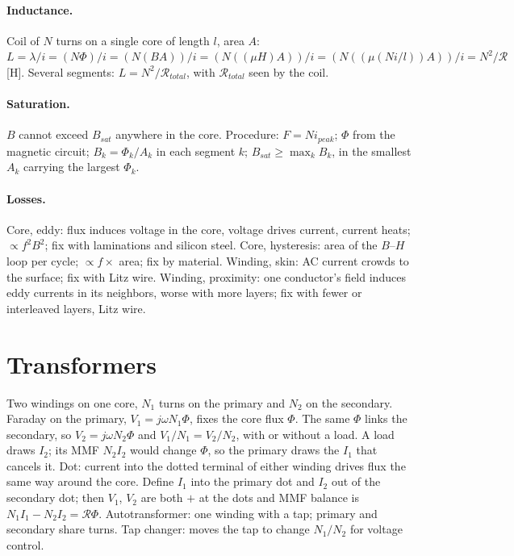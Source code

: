 \documentclass{article}
\begin{document}
\paragraph{Inductance.}
Coil of $N$ turns on a single core of length $l$, area $A$:
$L = \lambda / i = (N\Phi) / i = (N(BA))/i = (N((\mu H)A))/i = (N((\mu (Ni/l))A))/i = N^2/\mathcal R$ [H].
Several segments: $L = N^2/\mathcal R_{total}$, with $\mathcal R_{total}$ seen by the coil.

\paragraph{Saturation.}
$B$ cannot exceed $B_{sat}$ anywhere in the core.
Procedure: $F = Ni_{peak}$; $\Phi$ from the magnetic circuit; $B_k = \Phi_k/A_k$ in each segment $k$; $B_{sat} \ge \max_k B_k$, in the smallest $A_k$ carrying the largest $\Phi_k$.

\paragraph{Losses.}
Core, eddy: flux induces voltage in the core, voltage drives current, current heats; $\propto f^2B^2$; fix with laminations and silicon steel.
Core, hysteresis: area of the $B$--$H$ loop per cycle; $\propto f\times$ area; fix by material.
Winding, skin: AC current crowds to the surface; fix with Litz wire.
Winding, proximity: one conductor's field induces eddy currents in its neighbors, worse with more layers; fix with fewer or interleaved layers, Litz wire.



\section{Transformers}
Two windings on one core, $N_1$ turns on the primary and $N_2$ on the secondary.
Faraday on the primary, $V_1 = j\omega N_1 \Phi$, fixes the core flux $\Phi$.
The same $\Phi$ links the secondary, so $V_2 = j\omega N_2 \Phi$ and $V_1/N_1 = V_2/N_2$, with or without a load.
A load draws $I_2$; its MMF $N_2 I_2$ would change $\Phi$, so the primary draws the $I_1$ that cancels it.
Dot: current into the dotted terminal of either winding drives flux the same way around the core.
Define $I_1$ into the primary dot and $I_2$ out of the secondary dot; then $V_1$, $V_2$ are both $+$ at the dots and MMF balance is $N_1 I_1 - N_2 I_2 = \mathcal R\Phi$.
Autotransformer: one winding with a tap; primary and secondary share turns.
Tap changer: moves the tap to change $N_1/N_2$ for voltage control.
\end{document}
